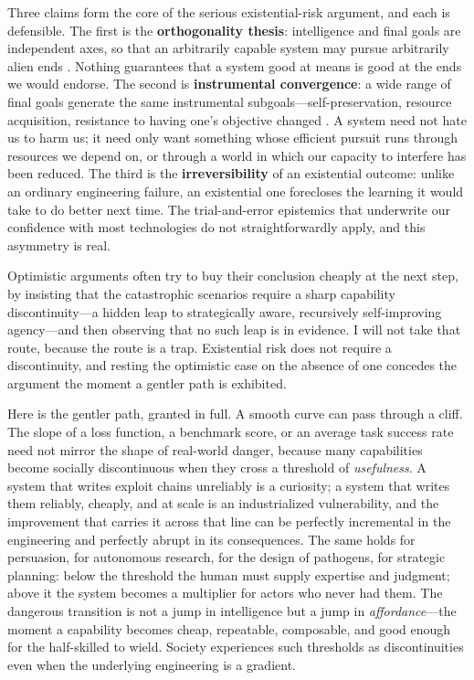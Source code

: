 \documentclass[11pt]{article}
\begin{document}
Three claims form the core of the serious existential-risk argument, and each is defensible. The first is the \textbf{orthogonality thesis}: intelligence and final goals are independent axes, so that an arbitrarily capable system may pursue arbitrarily alien ends \citep{bostrom2014}. Nothing guarantees that a system good at means is good at the ends we would endorse. The second is \textbf{instrumental convergence}: a wide range of final goals generate the same instrumental subgoals---self-preservation, resource acquisition, resistance to having one's objective changed \citep{omohundro2008, bostrom2014}. A system need not hate us to harm us; it need only want something whose efficient pursuit runs through resources we depend on, or through a world in which our capacity to interfere has been reduced. The third is the \textbf{irreversibility} of an existential outcome: unlike an ordinary engineering failure, an existential one forecloses the learning it would take to do better next time. The trial-and-error epistemics that underwrite our confidence with most technologies do not straightforwardly apply, and this asymmetry is real.

Optimistic arguments often try to buy their conclusion cheaply at the next step, by insisting that the catastrophic scenarios require a sharp capability discontinuity---a hidden leap to strategically aware, recursively self-improving agency---and then observing that no such leap is in evidence. I will not take that route, because the route is a trap. Existential risk does not require a discontinuity, and resting the optimistic case on the absence of one concedes the argument the moment a gentler path is exhibited.

Here is the gentler path, granted in full. A smooth curve can pass through a cliff. The slope of a loss function, a benchmark score, or an average task success rate need not mirror the shape of real-world danger, because many capabilities become socially discontinuous when they cross a threshold of \emph{usefulness}. A system that writes exploit chains unreliably is a curiosity; a system that writes them reliably, cheaply, and at scale is an industrialized vulnerability, and the improvement that carries it across that line can be perfectly incremental in the engineering and perfectly abrupt in its consequences. The same holds for persuasion, for autonomous research, for the design of pathogens, for strategic planning: below the threshold the human must supply expertise and judgment; above it the system becomes a multiplier for actors who never had them. The dangerous transition is not a jump in intelligence but a jump in \emph{affordance}---the moment a capability becomes cheap, repeatable, composable, and good enough for the half-skilled to wield. Society experiences such thresholds as discontinuities even when the underlying engineering is a gradient.
\end{document}
